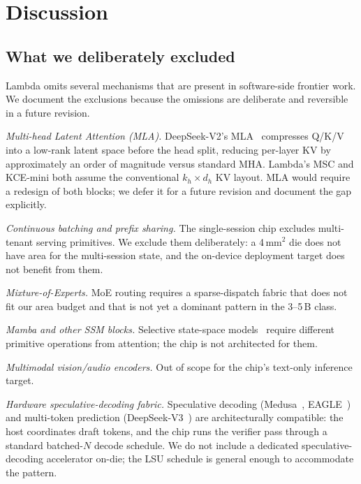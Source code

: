 \documentclass[conference]{IEEEtran}
\begin{document}
\section{Discussion}
\label{sec:discussion}

\subsection{What we deliberately excluded}

Lambda omits several mechanisms that are present in software-side frontier work. We document the exclusions because the omissions are deliberate and reversible in a future revision.

\textit{Multi-head Latent Attention (MLA).} DeepSeek-V2's MLA~\cite{mla} compresses Q/K/V into a low-rank latent space before the head split, reducing per-layer KV by approximately an order of magnitude versus standard MHA. Lambda's MSC and KCE-mini both assume the conventional $k_h \times d_h$ KV layout. MLA would require a redesign of both blocks; we defer it for a future revision and document the gap explicitly.

\textit{Continuous batching and prefix sharing.} The single-session chip excludes multi-tenant serving primitives. We exclude them deliberately: a 4\,mm$^2$ die does not have area for the multi-session state, and the on-device deployment target does not benefit from them.

\textit{Mixture-of-Experts.} MoE routing requires a sparse-dispatch fabric that does not fit our area budget and that is not yet a dominant pattern in the 3--5\,B class.

\textit{Mamba and other SSM blocks.} Selective state-space models~\cite{mamba} require different primitive operations from attention; the chip is not architected for them.

\textit{Multimodal vision/audio encoders.} Out of scope for the chip's text-only inference target.

\textit{Hardware speculative-decoding fabric.} Speculative decoding (Medusa~\cite{medusa}, EAGLE~\cite{eagle}) and multi-token prediction (DeepSeek-V3~\cite{deepseek_v3}) are architecturally compatible: the host coordinates draft tokens, and the chip runs the verifier pass through a standard batched-$N$ decode schedule. We do not include a dedicated speculative-decoding accelerator on-die; the LSU schedule is general enough to accommodate the pattern.
\end{document}
